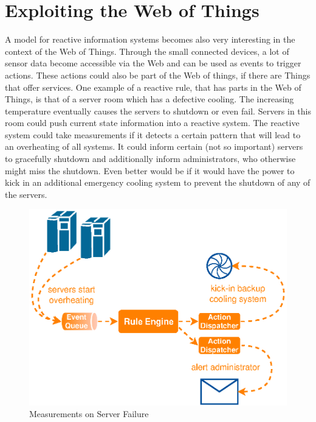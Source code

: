 \section{Exploiting the Web of Things}
A model for reactive information systems becomes also very interesting in the context of the \textrm{Web of Things}. 
Through the small connected devices, a lot of sensor data become accessible via the Web and can be used as events to trigger actions.
These actions could also be part of the Web of things, if there are \textrm{Things} that offer services.
One example of a reactive rule, that has parts in the \textrm{Web of Things}, is that of a server room which has a defective cooling.
The increasing temperature eventually causes the servers to shutdown or even fail.
Servers in this room could push current state information into a reactive system.
The reactive system could take measurements if it detects a certain pattern that will lead to an overheating of all systems.
It could inform certain (not so important) servers to gracefully shutdown and additionally inform administrators, who otherwise might miss the shutdown.
Even better would be if it would have the power to kick in an additional emergency cooling system to prevent the shutdown of any of the servers.
\begin{figure}[!ht]
  \centering
  \includegraphics{figures/WoT_Server}
  \caption{Measurements on Server Failure}
  \label{fig:WoT_Server}
\end{figure}

